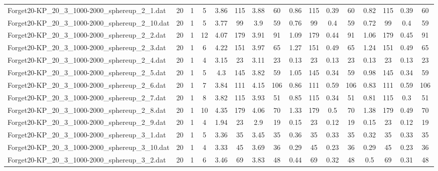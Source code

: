 \begin{sidewaystable}[!ht]
{\begin{tabular}{lccccccccccccccc}
Forget20-KP\_20\_3\_1000-2000\_sphereup\_2\_1.dat & 20 & 1 & 5 & 3.86 & 115 & 3.88 & 60 & 0.86 & 115 &  \textcolor{blue2}{0.39} & 60 & 0.82 & 115 &  \textcolor{blue2}{0.39} & 60 \\
Forget20-KP\_20\_3\_1000-2000\_sphereup\_2\_10.dat & 20 & 1 & 5 & 3.77 & 99 & 3.9 & 59 & 0.76 & 99 &  \textcolor{blue2}{0.4} & 59 & 0.72 & 99 &  \textcolor{blue2}{0.4} & 59 \\
Forget20-KP\_20\_3\_1000-2000\_sphereup\_2\_2.dat & 20 & 1 & 12 & 4.07 & 179 & 3.91 & 91 & 1.09 & 179 &  \textcolor{blue2}{0.44} & 91 & 1.06 & 179 & 0.45 & 91 \\
Forget20-KP\_20\_3\_1000-2000\_sphereup\_2\_3.dat & 20 & 1 & 6 & 4.22 & 151 & 3.97 & 65 & 1.27 & 151 &  \textcolor{blue2}{0.49} & 65 & 1.24 & 151 &  \textcolor{blue2}{0.49} & 65 \\
Forget20-KP\_20\_3\_1000-2000\_sphereup\_2\_4.dat & 20 & 1 & 4 & 3.15 & 23 & 3.11 & 23 &  \textcolor{blue2}{0.13} & 23 &  \textcolor{blue2}{0.13} & 23 &  \textcolor{blue2}{0.13} & 23 &  \textcolor{blue2}{0.13} & 23 \\
Forget20-KP\_20\_3\_1000-2000\_sphereup\_2\_5.dat & 20 & 1 & 5 & 4.3 & 145 & 3.82 & 59 & 1.05 & 145 &  \textcolor{blue2}{0.34} & 59 & 0.98 & 145 &  \textcolor{blue2}{0.34} & 59 \\
Forget20-KP\_20\_3\_1000-2000\_sphereup\_2\_6.dat & 20 & 1 & 7 & 3.84 & 111 & 4.15 & 106 & 0.86 & 111 &  \textcolor{blue2}{0.59} & 106 & 0.83 & 111 &  \textcolor{blue2}{0.59} & 106 \\
Forget20-KP\_20\_3\_1000-2000\_sphereup\_2\_7.dat & 20 & 1 & 8 & 3.82 & 115 & 3.93 & 51 & 0.85 & 115 & 0.34 & 51 & 0.81 & 115 &  \textcolor{blue2}{0.3} & 51 \\
Forget20-KP\_20\_3\_1000-2000\_sphereup\_2\_8.dat & 20 & 1 & 10 & 4.35 & 179 & 4.06 & 70 & 1.33 & 179 & 0.5 & 70 & 1.38 & 179 &  \textcolor{blue2}{0.49} & 70 \\
Forget20-KP\_20\_3\_1000-2000\_sphereup\_2\_9.dat & 20 & 1 & 4 & 1.94 & 23 & 2.9 & 19 & 0.15 & 23 &  \textcolor{blue2}{0.12} & 19 & 0.15 & 23 &  \textcolor{blue2}{0.12} & 19 \\
Forget20-KP\_20\_3\_1000-2000\_sphereup\_3\_1.dat & 20 & 1 & 5 & 3.36 & 35 & 3.45 & 35 & 0.36 & 35 & 0.33 & 35 &  \textcolor{blue2}{0.32} & 35 & 0.33 & 35 \\
Forget20-KP\_20\_3\_1000-2000\_sphereup\_3\_10.dat & 20 & 1 & 4 & 3.33 & 45 & 3.69 & 36 & 0.29 & 45 &  \textcolor{blue2}{0.23} & 36 & 0.29 & 45 &  \textcolor{blue2}{0.23} & 36 \\
Forget20-KP\_20\_3\_1000-2000\_sphereup\_3\_2.dat & 20 & 1 & 6 & 3.46 & 69 & 3.83 & 48 & 0.44 & 69 & 0.32 & 48 & 0.5 & 69 &  \textcolor{blue2}{0.31} & 48 \\

\end{tabular}}
\end{sidewaystable}
